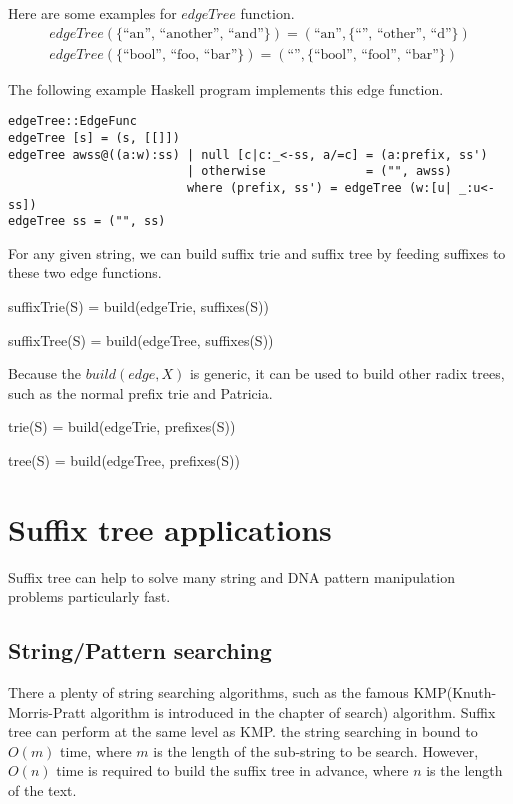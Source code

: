 \documentclass{article}
\begin{document}
Here are some examples for $edgeTree$ function.
\[
\begin{array}{l}
edgeTree(\{ \text{``an'', ``another'', ``and''}\}) = (\text{``an''}, \{\text{``'', ``other'', ``d''}\}) \\
edgeTree(\{ \text{``bool'', ``foo, ``bar''}\}) = (\text{``''}, \{\text{``bool'', ``fool'', ``bar''}\})
\end{array}
\]

The following example Haskell program implements this edge function.

\begin{lstlisting}
edgeTree::EdgeFunc
edgeTree [s] = (s, [[]])
edgeTree awss@((a:w):ss) | null [c|c:_<-ss, a/=c] = (a:prefix, ss')
                         | otherwise              = ("", awss)
                         where (prefix, ss') = edgeTree (w:[u| _:u<-ss])
edgeTree ss = ("", ss)
\end{lstlisting}

For any given string, we can build suffix trie and suffix tree by feeding suffixes to these
two edge functions.

\be
suffixTrie(S) = build(edgeTrie, suffixes(S))
\ee

\be
suffixTree(S) = build(edgeTree, suffixes(S))
\ee

Because the $build(edge, X)$ is generic, it can be used to build other radix trees, such
as the normal prefix trie and Patricia.

\be
trie(S) = build(edgeTrie, prefixes(S))
\ee

\be
tree(S) = build(edgeTree, prefixes(S))
\ee


\section{Suffix tree applications}

Suffix tree can help to solve many string and DNA pattern manipulation problems
particularly fast.

\subsection{String/Pattern searching}
\label{substring-lookup}

There a plenty of string searching algorithms, such as the
famous KMP(Knuth-Morris-Pratt algorithm is introduced in the chapter of search)
algorithm. Suffix tree can perform at the same level as
KMP\cite{zhang-shaojie-lec}. the string searching in bound to $O(m)$ time,
where $m$ is the length of the sub-string to be search. However, $O(n)$ time is
required to build the suffix tree in advance, where $n$ is the length
of the text\cite{lallison-stree}.
\end{document}
